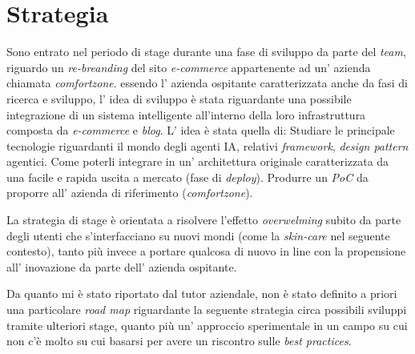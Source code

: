 \section{Strategia}%

Sono entrato nel periodo di stage durante una fase di sviluppo da parte del \emph{team}, riguardo un \emph{re-breanding} del sito \emph{e-commerce} appartenente ad 
un' azienda chiamata \emph{comfortzone}.
essendo l' azienda ospitante caratterizzata anche da fasi di ricerca e sviluppo, l' idea di sviluppo è stata riguardante una possibile integrazione di un sistema intelligente
all'interno della loro infrastruttura composta da \emph{e-commerce} e \emph{blog}.
L' idea è stata quella di:
Studiare le principale tecnologie riguardanti il mondo degli agenti IA, relativi \emph{framework}, \emph{design pattern} agentici.
Come poterli integrare in un' architettura originale caratterizzata da una facile e rapida uscita a mercato (fase di \emph{deploy}).
Produrre un \emph{PoC} da proporre all' azienda di riferimento (\emph{comfortzone}).

La strategia di stage è orientata a risolvere l'effetto \emph{overwelming} subito da parte degli utenti che s'interfacciano su nuovi mondi (come la \emph{skin-care} nel seguente contesto), tanto più invece a portare qualcosa di nuovo
in line con la propensione all' inovazione da parte dell' azienda ospitante.

Da quanto mi è stato riportato dal tutor aziendale, non è stato definito a priori una particolare \emph{road map} riguardante la seguente strategia circa possibili sviluppi
tramite ulteriori stage, quanto più un' approccio sperimentale in un campo su cui non c'è molto su cui basarsi per avere un riscontro sulle \emph{best practices}.




